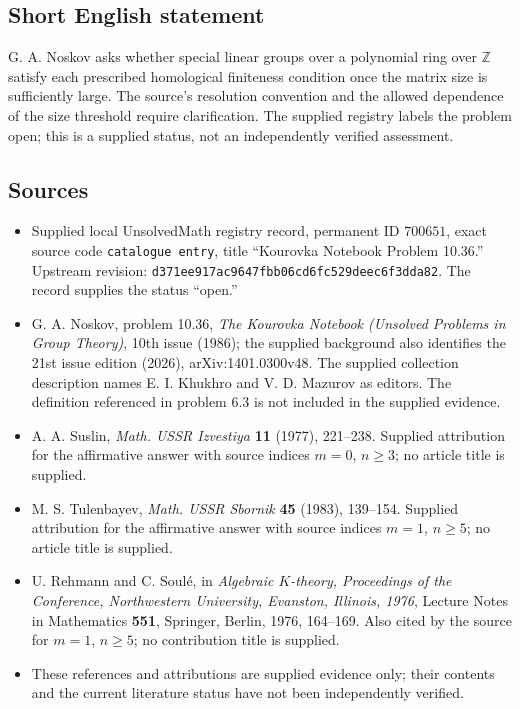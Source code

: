\documentclass[11pt]{article}
\newcommand{\Z}{\mathbb{Z}}
\begin{document}
\subsection{Short English statement}
G. A. Noskov asks whether special linear groups over a polynomial ring over \(\Z\) satisfy each prescribed homological finiteness condition once the matrix size is sufficiently large. The source's resolution convention and the allowed dependence of the size threshold require clarification. The supplied registry labels the problem open; this is a supplied status, not an independently verified assessment.
\subsection{Sources}
\begin{itemize}
\item Supplied local UnsolvedMath registry record, permanent ID \(700651\), exact source code \texttt{catalogue entry}, title ``Kourovka Notebook Problem 10.36.'' Upstream revision: \texttt{d371ee917ac9647fbb06cd6fc529deec6f3dda82}. The record supplies the status ``open.''
\item G. A. Noskov, problem 10.36, \emph{The Kourovka Notebook (Unsolved Problems in Group Theory)}, 10th issue (1986); the supplied background also identifies the 21st issue edition (2026), arXiv:1401.0300v48. The supplied collection description names E. I. Khukhro and V. D. Mazurov as editors. The definition referenced in problem 6.3 is not included in the supplied evidence.
\item A. A. Suslin, \emph{Math. USSR Izvestiya} \textbf{11} (1977), 221--238. Supplied attribution for the affirmative answer with source indices \(m=0\), \(n\geq3\); no article title is supplied.
\item M. S. Tulenbayev, \emph{Math. USSR Sbornik} \textbf{45} (1983), 139--154. Supplied attribution for the affirmative answer with source indices \(m=1\), \(n\geq5\); no article title is supplied.
\item U. Rehmann and C. Soul\'e, in \emph{Algebraic \(K\)-theory, Proceedings of the Conference, Northwestern University, Evanston, Illinois, 1976}, Lecture Notes in Mathematics \textbf{551}, Springer, Berlin, 1976, 164--169. Also cited by the source for \(m=1\), \(n\geq5\); no contribution title is supplied.
\item These references and attributions are supplied evidence only; their contents and the current literature status have not been independently verified.
\end{itemize}
\end{document}
